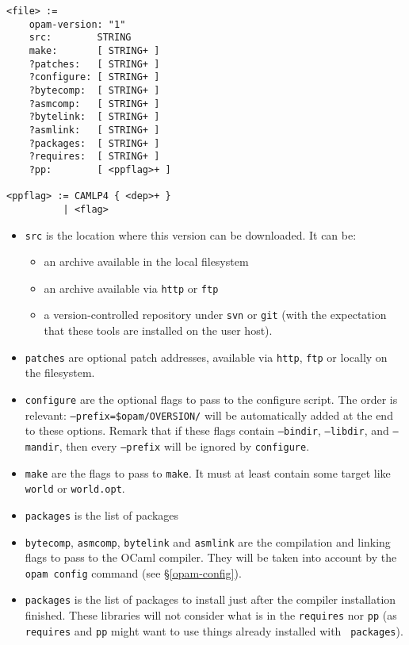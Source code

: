 \documentclass[a4paper,11pt]{article}
\begin{document}
{
\begin{Verbatim}[frame=single]
<file> :=
    opam-version: "1"
    src:        STRING
    make:       [ STRING+ ]
    ?patches:   [ STRING+ ]
    ?configure: [ STRING+ ]
    ?bytecomp:  [ STRING+ ]
    ?asmcomp:   [ STRING+ ]
    ?bytelink:  [ STRING+ ]
    ?asmlink:   [ STRING+ ]
    ?packages:  [ STRING+ ]
    ?requires:  [ STRING+ ]
    ?pp:        [ <ppflag>+ ]

<ppflag> := CAMLP4 { <dep>+ }
          | <flag>
\end{Verbatim}
}
\begin{itemize}

\item {\tt src} is the location where this version can be downloaded. It can be:
\begin{itemize}
\item an archive available in the local filesystem
\item an archive available via {\tt http} or {\tt ftp}
\item a version-controlled repository under {\tt svn} or {\tt git}
  (with the expectation that these tools are installed on the user host).
\end{itemize}

\item {\tt patches} are optional patch addresses, available via {\tt http}, {\tt ftp}
  or locally on the filesystem.

\item {\tt configure} are the optional flags to pass to the configure
  script. The order is relevant: {\tt --prefix=\$opam/OVERSION/} will be automatically 
  added at the end to these options.
  Remark that if these flags contain {\tt --bindir}, {\tt --libdir}, 
  and {\tt --mandir}, then every {\tt --prefix} will be ignored by {\tt configure}.

\item {\tt make} are the flags to pass to {\tt make}. 
  It must at least contain some target like {\tt world} or {\tt world.opt}.

\item {\tt packages} is the list of packages

\item {\tt bytecomp}, {\tt asmcomp}, {\tt bytelink} and {\tt asmlink}
  are the compilation and linking flags to pass to the OCaml
  compiler. They will be taken into account by the \verb+opam config+
  command (see \S\ref{opam-config}).

\item {\tt packages} is the list of packages to install just after the
  compiler installation finished. These libraries will not consider
  what is in the {\tt requires} nor {\tt pp} (as {\tt requires} and
  {\tt pp} might want to use things already installed with {\tt
    packages}).


\end{itemize}
\end{document}
